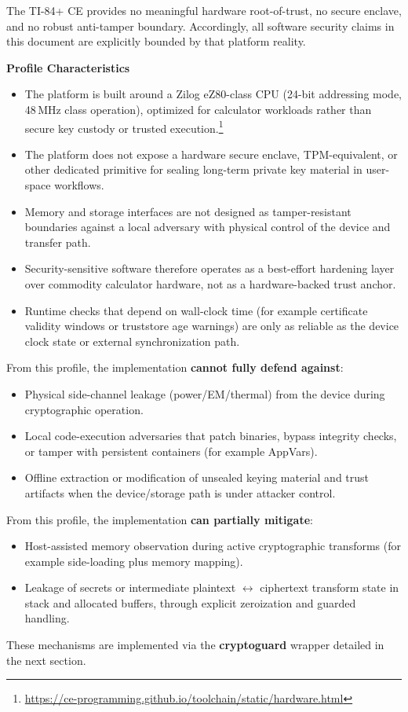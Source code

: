 \documentclass[titlepage]{report}
\begin{document}
	The TI-84+ CE provides no meaningful hardware root-of-trust, no secure enclave, and no robust anti-tamper boundary. Accordingly, all software security claims in this document are explicitly bounded by that platform reality. 
	
	\textbf{Profile Characteristics}
	\begin{itemize}
		\item The platform is built around a Zilog eZ80-class CPU (24-bit addressing mode, 48\,MHz class operation), optimized for calculator workloads rather than secure key custody or trusted execution.\footnote{\url{https://ce-programming.github.io/toolchain/static/hardware.html}}
		\item The platform does not expose a hardware secure enclave, TPM-equivalent, or other dedicated primitive for sealing long-term private key material in user-space workflows.
		\item Memory and storage interfaces are not designed as tamper-resistant boundaries against a local adversary with physical control of the device and transfer path.
		\item Security-sensitive software therefore operates as a best-effort hardening layer over commodity calculator hardware, not as a hardware-backed trust anchor.
		\item Runtime checks that depend on wall-clock time (for example certificate validity windows or truststore age warnings) are only as reliable as the device clock state or external synchronization path.
	\end{itemize}
	
	From this profile, the implementation \textbf{cannot fully defend against}:
	\begin{itemize}
		\item Physical side-channel leakage (power/EM/thermal) from the device during cryptographic operation.
		\item Local code-execution adversaries that patch binaries, bypass integrity checks, or tamper with persistent containers (for example AppVars).
		\item Offline extraction or modification of unsealed keying material and trust artifacts when the device/storage path is under attacker control.
	\end{itemize}
	
From this profile, the implementation \textbf{can partially mitigate}:
\begin{itemize}
	\item Host-assisted memory observation during active cryptographic transforms (for example side-loading plus memory mapping).
	\item Leakage of secrets or intermediate plaintext $\leftrightarrow$ ciphertext transform state in stack and allocated buffers, through explicit zeroization and guarded handling.
\end{itemize}
These mechanisms are implemented via the \textbf{cryptoguard} wrapper detailed in the next section.
	
\end{document}
